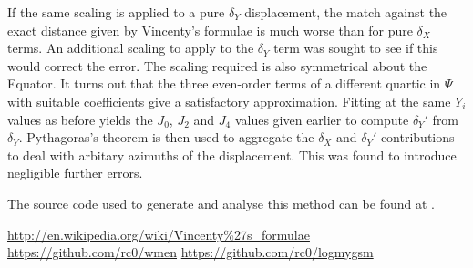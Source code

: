 \documentclass[10pt,a4paper,twocolumn]{article}
\begin{document}
If the same scaling is applied to a pure $\delta_Y$ displacement, the match
against the exact distance given by Vincenty's formulae \cite{vincenty} is much
worse than for pure $\delta_X$ terms.  An additional scaling to apply to the
$\delta_Y$ term was sought to see if this would correct the error.  The scaling
required is also symmetrical about the Equator.  It turns out that the three
even-order terms of a different quartic in $\Psi$ with suitable coefficients
give a satisfactory approximation.  Fitting at the same $Y_i$ values as before
yields the $J_0$, $J_2$ and $J_4$ values given earlier to compute $\delta_Y'$
from $\delta_Y$.  Pythagoras's theorem is then used to aggregate the $\delta_X$
and $\delta_Y'$ contributions to deal with arbitary azimuths of the
displacement.  This was found to introduce negligible further errors.

The source code used to generate and analyse this method can be found at
\cite{source}.

\begin{thebibliography}{99}
   \url{http://en.wikipedia.org/wiki/Vincenty%27s_formulae}
     \url{https://github.com/rc0/wmen}
   \url{https://github.com/rc0/logmygsm}
\end{thebibliography}
\end{document}
